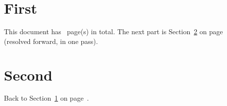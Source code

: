 \documentclass{article}
\begin{document}
\section{First}\label{sec:first}
This document has \lastpage\ page(s) in total.
The next part is Section~\ref{sec:second} on page~\pageref{sec:second}
(resolved forward, in one pass).

\section{Second}\label{sec:second}
Back to Section~\ref{sec:first} on page~\pageref{sec:first}.
\end{document}
